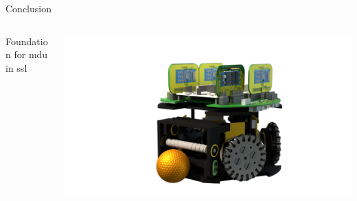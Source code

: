 
\begin{frame}{Conclusion}

    \begin{columns}[T]
        \begin{column}{0.5\textwidth}

            \vspace{2cm}

            Foundation for \ac{mdu} in \ac{ssl}
            
        \end{column}
        \begin{column}{0.5\textwidth}

            \begin{adjustbox}{scale=1.8,center,margin={-1cm,3cm,2cm,0cm}}
                \includegraphics[width=1\textwidth]{image/png/robot_base.png}
            \end{adjustbox}
            
        \end{column}
    \end{columns}

\end{frame}

